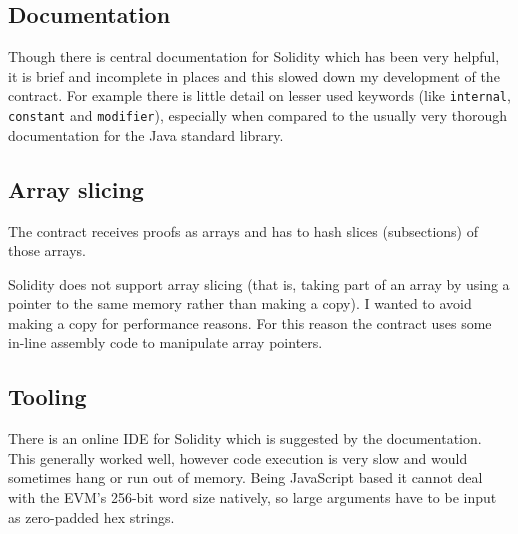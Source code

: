 \documentclass[12pt,a4paper,twoside,openright]{report}
\begin{document}
\subsection{Documentation}

Though there is central documentation for Solidity which has been very helpful, it is brief and incomplete in places and this slowed down my development of the contract.
For example there is little detail on lesser used keywords (like \texttt{internal}, \texttt{constant} and \texttt{modifier}), especially when compared to the usually very thorough documentation for the Java standard library.

\subsection{Array slicing}

The contract receives proofs as arrays and has to hash slices (subsections) of those arrays.

Solidity does not support array slicing (that is, taking part of an array by using a pointer to the same memory rather than making a copy).
I wanted to avoid making a copy for performance reasons.
For this reason the contract uses some in-line assembly code to manipulate array pointers.



%


\subsection{Tooling}

There is an online IDE for Solidity\cite{browser-solidity} which is suggested by the documentation.
This generally worked well, however code execution is very slow and would sometimes hang or run out of memory.
Being JavaScript based it cannot deal with the EVM's 256-bit word size natively, so large arguments have to be input as zero-padded hex strings.
\end{document}
